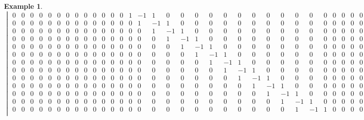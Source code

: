 \documentclass{article}
\newtheorem*{Definition: Sylvester Matrix}{Definition}
\newtheorem*{Definition: Resultant 1}{Definition 1}
\newtheorem*{Definition: Resultant 2}{Definition 2}
\newtheorem*{Theorem: Resultant proves shared roots}{Theorem 1}
\newtheorem*{Theorem: Minimal polynomial for beta}{Theorem 2}
\newtheorem*{Example: Sylvester Matrix Ex}{Example}
\newtheorem*{Theorem: Roots}{Theorem}
\newtheorem*{Corollary: Discriminant}{Corollary}
\newtheorem*{Theorem: Rational Root Theorem}{Theorem}
\newtheorem*{Corollary: Cubic Irreducibility}{Corollary}
\newtheorem*{Theorem: Eisenstein Criterion}{Theorem}
\newtheorem*{Theorem: mod p Test}{Theorem}
\newtheorem*{Theorem: Rabin's algorithm}{Theorem}
\newtheorem*{Theorem: gcd finite field}{Theorem}
\newtheorem*{Theorem: Gauss Irreducibles}{Theorem}
\newtheorem*{Theorem: Number of irreducibles}{Theorem}
\newtheorem*{Example: All irreducibles in Z_2}{Example}
\newtheorem*{Formula: Minimal polynomial for r root of a}{Formula 1}
\newtheorem*{Example: minimal polynomial for sqrt(p)}{Example}
\newtheorem*{Example: Golden Ratio}{Example}
\newtheorem*{Formula: Minimal polynomial for a+b}{Formula 2}
\newtheorem*{Example: 1 + sqrt(3)}{Example}
\newtheorem*{Example: cubic root of unity}{Example}
\newtheorem*{Formula: Minimal polynomial for a/b}{Formula 3}
\newtheorem*{Formula: Minimal polynomial for ab}{Formula 4}
\newtheorem*{Example: cubrt(4)/i+1}{Example}
\newtheorem*{Example: 5zeta}{Example}
\newtheorem*{Example: Wild one}{Example}
\begin{document}
\begin{Example: Wild one}
$$\begin{vmatrix}
 0 &  0 &  0 &  0 &  0 &  0 &  0 &  0 &  0 &  0 &  0 &  0 &  0 &  1 &  -1 &  1 &  0 &  0 &  0 &  0 &  0 &  0 &  0 &  0 &  0 &  0 &  0 &  0 &  0 &  0 &  0 &  0\\
 0 &  0 &  0 &  0 &  0 &  0 &  0 &  0 &  0 &  0 &  0 &  0 &  0 &  0 &  1 &  -1 &  1 &  0 &  0 &  0 &  0 &  0 &  0 &  0 &  0 &  0 &  0 &  0 &  0 &  0 &  0 &  0\\
 0 &  0 &  0 &  0 &  0 &  0 &  0 &  0 &  0 &  0 &  0 &  0 &  0 &  0 &  0 &  1 &  -1 &  1 &  0 &  0 &  0 &  0 &  0 &  0 &  0 &  0 &  0 &  0 &  0 &  0 &  0 &  0\\
 0 &  0 &  0 &  0 &  0 &  0 &  0 &  0 &  0 &  0 &  0 &  0 &  0 &  0 &  0 &  0 &  1 &  -1 &  1 &  0 &  0 &  0 &  0 &  0 &  0 &  0 &  0 &  0 &  0 &  0 &  0 &  0\\
 0 &  0 &  0 &  0 &  0 &  0 &  0 &  0 &  0 &  0 &  0 &  0 &  0 &  0 &  0 &  0 &  0 &  1 &  -1 &  1 &  0 &  0 &  0 &  0 &  0 &  0 &  0 &  0 &  0 &  0 &  0 &  0\\
 0 &  0 &  0 &  0 &  0 &  0 &  0 &  0 &  0 &  0 &  0 &  0 &  0 &  0 &  0 &  0 &  0 &  0 &  1 &  -1 &  1 &  0 &  0 &  0 &  0 &  0 &  0 &  0 &  0 &  0 &  0 &  0\\
 0 &  0 &  0 &  0 &  0 &  0 &  0 &  0 &  0 &  0 &  0 &  0 &  0 &  0 &  0 &  0 &  0 &  0 &  0 &  1 &  -1 &  1 &  0 &  0 &  0 &  0 &  0 &  0 &  0 &  0 &  0 &  0\\
 0 &  0 &  0 &  0 &  0 &  0 &  0 &  0 &  0 &  0 &  0 &  0 &  0 &  0 &  0 &  0 &  0 &  0 &  0 &  0 &  1 &  -1 &  1 &  0 &  0 &  0 &  0 &  0 &  0 &  0 &  0 &  0\\
 0 &  0 &  0 &  0 &  0 &  0 &  0 &  0 &  0 &  0 &  0 &  0 &  0 &  0 &  0 &  0 &  0 &  0 &  0 &  0 &  0 &  1 &  -1 &  1 &  0 &  0 &  0 &  0 &  0 &  0 &  0 &  0\\
 0 &  0 &  0 &  0 &  0 &  0 &  0 &  0 &  0 &  0 &  0 &  0 &  0 &  0 &  0 &  0 &  0 &  0 &  0 &  0 &  0 &  0 &  1 &  -1 &  1 &  0 &  0 &  0 &  0 &  0 &  0 &  0\\
 0 &  0 &  0 &  0 &  0 &  0 &  0 &  0 &  0 &  0 &  0 &  0 &  0 &  0 &  0 &  0 &  0 &  0 &  0 &  0 &  0 &  0 &  0 &  1 &  -1 &  1 &  0 &  0 &  0 &  0 &  0 &  0\\
 0 &  0 &  0 &  0 &  0 &  0 &  0 &  0 &  0 &  0 &  0 &  0 &  0 &  0 &  0 &  0 &  0 &  0 &  0 &  0 &  0 &  0 &  0 &  0 &  1 &  -1 &  1 &  0 &  0 &  0 &  0 &  0\\
 0 &  0 &  0 &  0 &  0 &  0 &  0 &  0 &  0 &  0 &  0 &  0 &  0 &  0 &  0 &  0 &  0 &  0 &  0 &  0 &  0 &  0 &  0 &  0 &  0 &  1 &  -1 &  1 &  0 &  0 &  0 &  0\\

\end{vmatrix}$$
\end{Example: Wild one}
\end{document}
